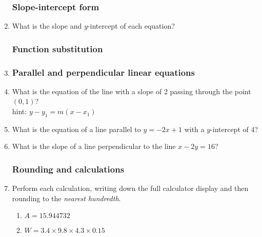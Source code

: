 \begin{enumerate}
  \subsubsection*{Slope-intercept form}
  \item What is the slope and $y$-intercept of each equation?
\begin{enumerate}[itemsep=2cm]
    \end{enumerate} \vspace{1.5cm}
  
\subsubsection*{Function substitution}
\item 
\begin{enumerate}[itemsep=2cm]
    \end{enumerate}


\newpage
\subsubsection*{Parallel and perpendicular linear equations}

  \item What is the equation of the line with a slope of 2 passing through the point $(0,1)$? \\
  hint: $y-y_1=m(x-x_1)$ \vspace{1.5cm}
  \item What is the equation of a line parallel to $y=-2x+1$ with a $y$-intercept of 4? \vspace{1.5cm}
  \item What is the slope of a line perpendicular to the line $x-2y=16$? \vspace{3cm}

\subsubsection*{Rounding and calculations}
  \item Perform each calculation, writing down the full calculator display and then rounding to the \emph{nearest hundredth}.
    \begin{multicols}{2}
    \begin{enumerate}[itemsep=2cm]
      \item $A=15.944732$
      \item $W=3.4 \times 9.8 \times 4.3 \times 0.15$
            

\end{enumerate}
\end{multicols}
\end{enumerate}
